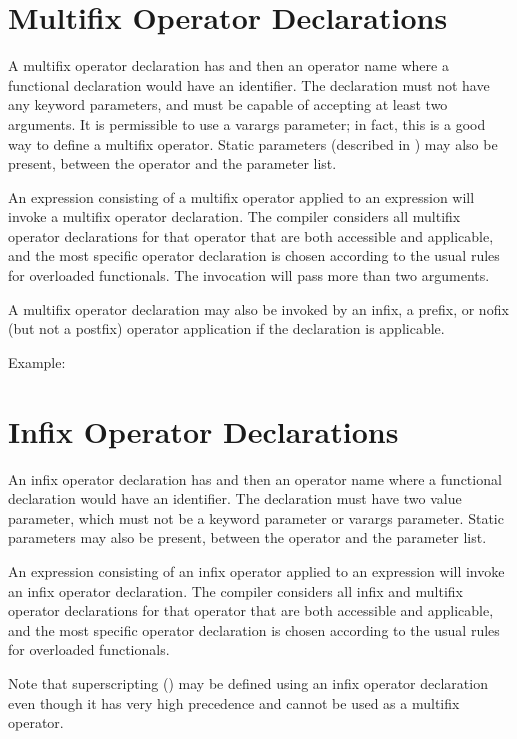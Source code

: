 \section{Multifix Operator Declarations}

A multifix operator declaration has 
and then an operator name where a
functional declaration would have an identifier.
The declaration must not have any keyword parameters, and must
be capable of accepting at least two arguments.  It is permissible
to use a varargs parameter; in fact, this is a good way to
define a multifix operator.
Static parameters (described in )
 may also be present, between the operator and
the parameter list.

An expression consisting of a multifix operator applied to
an expression will invoke a multifix operator declaration.
The compiler considers all multifix operator declarations for that
operator that are both
accessible and applicable, and the most specific operator declaration
is chosen according to the usual rules for overloaded functionals.
The invocation will pass more than two arguments.

A multifix operator declaration may also be invoked
by an infix, a prefix, or nofix (but not a postfix) operator application if
the declaration is applicable.

Example:
%

\section{Infix Operator Declarations}

An infix operator declaration has 
and then an operator name where a
functional declaration would have an identifier.
The declaration must have two value parameter,
which must not be a keyword parameter or varargs parameter.
Static parameters may also be present,
between the operator and the parameter list.

An expression consisting of an infix operator applied to
an expression will invoke an infix operator declaration.
The compiler considers all infix and multifix
operator declarations for that
operator that are both
accessible and applicable, and the most specific operator declaration
is chosen according to the usual rules for overloaded functionals.

Note that superscripting () may be defined using
an infix operator declaration even though it has very high precedence
and cannot be used as a multifix operator.

